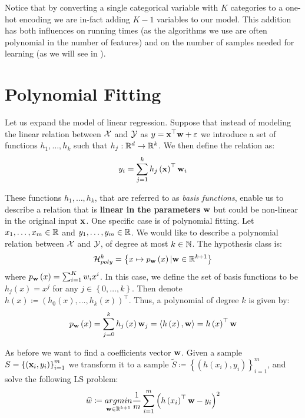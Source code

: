 \begin{remark}
Notice that by converting a single categorical variable with $K$ categories to a one-hot encoding we are in-fact adding $K-1$ variables to our model. This addition has both influences on running times (as the algorithms we use are often polynomial in the number of features) and on the number of samples needed for learning (as we will see in ).
\end{remark}
\begin{remark}
\end{remark}

\section{Polynomial Fitting}

Let us expand the model of linear regression. Suppose that instead of modeling the linear relation between $\mathcal{X}$ and $\mathcal{Y}$ as $y=\mathbf{x}^\top\mathbf{w}+\varepsilon$ we introduce a set of functions $h_1,\ldots,h_k$ such that $h_j:\mathbb{R}^d\rightarrow\mathbb{R}^k$. We then define the relation as: $$y_i=\sum_{j=1}^kh_j\left(\mathbf{x}\right)^\top\mathbf{w}_i$$

These functions $h_1,\ldots,h_k$, that are referred to as \textit{basis functions}, enable us to describe a relation that is \textbf{linear in the parameters} $\mathbf{w}$ but could be non-linear in the original input $\mathbf{x}$. One specific case is of polynomial fitting. Let $x_1,\ldots,x_m\in\mathbb{R}$ and $y_1,\ldots,y_m\in\mathbb{R}$. We would like to describe a polynomial relation between $\mathcal{X}$ and $\mathcal{Y}$, of degree at most $k\in\mathbb{N}$. The hypothesis class is: 
\begin{equation}
\mathcal{H}^k_{poly}=\left\{x\mapsto p_{\mathbf{w}}\left(x\right)| \mathbf{w}\in\mathbb{R}^{k+1}\right\}
\label{eqn:poly_reg}
\end{equation}
where $p_{\mathbf{w}}\left(x\right)=\sum^{K}_{i=1}w_i x^i$. In this case, we define the set of basis functions to be $h_j\left(x\right)=x^j$ for any $j\in\left\{0,\ldots,k\right\}$. Then denote $h\left(x\right)\coloneqq\left(h_0\left(x\right),\ldots,h_k\left(x\right)\right)^\top$. Thus, a polynomial of degree $k$ is given by:
$$ p_{\mathbf{w}}\left(x\right)=\sum^k_{j=0}h_j\left(x\right)\mathbf{w}_j= \left\langle h\left(x\right),\mathbf{w}\right\rangle =h\left(x\right)^{\top} \mathbf{w} $$

As before we want to find a coefficients vector $\mathbf{w}$. Given a sample $S=\left\{\left(\mathbf{x}_i,y_i\right)\right\}^m_{i=1}$ we transform it to a sample $\widetilde{S}\coloneqq\left\{\left(h\left(x_i\right),y_i\right)\right\}^m_{i=1}$, and solve the following LS problem: $$ \widehat{w}\coloneqq\underset{\mathbf{w}\in\mathbb{R}^{k+1}}{argmin}\frac{1}{m}\sum^m_{i=1}\left(h\left(x_i\right)^\top \mathbf{w} -y_i\right)^2 $$

